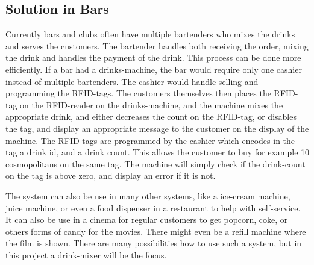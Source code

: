 \subsection{Solution in Bars}
Currently bars and clubs often have multiple bartenders who mixes the drinks and serves the customers. The bartender handles both receiving the order, mixing the drink and handles the payment of the drink. This process can be done more efficiently. If a bar had a drinks-machine, the bar would require only one cashier instead of multiple bartenders. The cashier would handle selling and programming the RFID-tags. The customers themselves then places the RFID-tag on the RFID-reader on the drinks-machine, and the machine mixes the appropriate drink, and either decreases the count on the RFID-tag, or disables the tag, and display an appropriate message to the customer on the display of the machine. The RFID-tags are programmed by the cashier which encodes in the tag a drink id, and a drink count. This allows the customer to buy for example 10 cosmopolitans on the same tag. The machine will simply check if the drink-count on the tag is above zero, and display an error if it is not.

The system can also be use in many other systems, like a ice-cream machine, juice machine, or even a food dispenser in a restaurant to help with self-service. It can also be use in a cinema for regular customers to get popcorn, coke, or others forms of candy for the movies. There might even be a refill machine where the film is shown. There are many possibilities how to use such a system, but in this project a drink-mixer will be the focus.